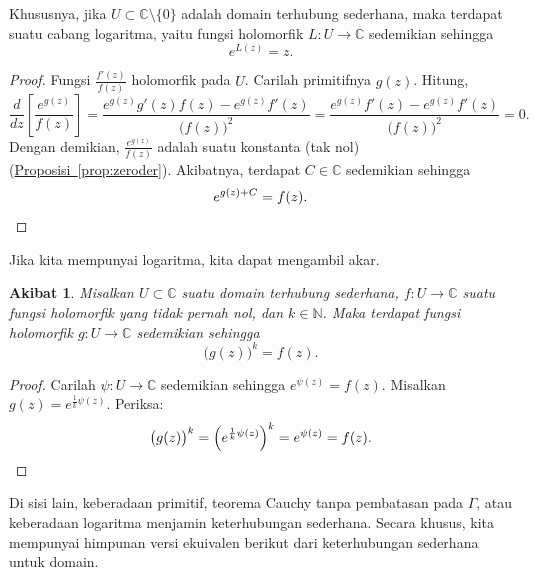 \documentclass[12pt,openany]{book}
\newcommand{\C}{{\mathbb{C}}}
\newcommand{\N}{{\mathbb{N}}}
\theoremstyle{plain}
\newtheorem{cor}[thm]{Akibat}
\theoremstyle{remark}
\theoremstyle{definition}
\theoremstyle{exercise}
\theoremstyle{example}
\newcommand{\propref}[1]{\hyperref[#1]{Proposisi~\ref*{#1}}}
\begin{document}
Khususnya,
jika $U \subset \C \setminus \{ 0 \}$ adalah domain terhubung sederhana, maka
terdapat suatu cabang logaritma, yaitu
fungsi holomorfik $L \colon U \to \C$ sedemikian sehingga
\begin{equation*}
e^{L(z)} = z .
\end{equation*}

\begin{proof}
Fungsi $\frac{f'(z)}{f(z)}$ holomorfik pada $U$.
Carilah primitifnya $g(z)$. Hitung,
\begin{equation*}
\frac{d}{dz} \left[ \frac{e^{g(z)}}{f(z)} \right] =
\frac{ e^{g(z)} g'(z) f(z) - e^{g(z)} f'(z) }{{\bigl(f(z)\bigr)}^2}
=
\frac{ e^{g(z)} f'(z) - e^{g(z)} f'(z) }{{\bigl(f(z)\bigr)}^2}
=
0 .
\end{equation*}
Dengan demikian, $\frac{e^{g(z)}}{f(z)}$ adalah suatu konstanta (tak nol)
(\propref{prop:zeroder}). Akibatnya,
terdapat $C \in \C$ sedemikian sehingga
\begin{equation*}
e^{g(z) + C} = f(z) .
\qedhere
\end{equation*}
\end{proof}

Jika kita mempunyai logaritma, kita dapat mengambil akar.

\begin{cor}
Misalkan $U \subset \C$ suatu domain terhubung sederhana,
$f \colon U \to \C$ suatu fungsi holomorfik yang tidak pernah nol,
dan $k \in \N$.
Maka terdapat fungsi holomorfik $g \colon U \to \C$
sedemikian sehingga
\begin{equation*}
{\bigl(g(z)\bigr)}^k = f(z) .
\end{equation*}
\end{cor}

\begin{proof}
Carilah $\psi \colon U \to \C$ sedemikian sehingga $e^{\psi(z)} = f(z)$. Misalkan
$g(z) = e^{\frac{1}{k} \psi(z)}$. Periksa:
\begin{equation*}
{\bigl(g(z)\bigr)}^k
=
{\left( e^{\frac{1}{k} \psi(z)} \right)}^k
=
e^{\psi(z)} = f(z) . \qedhere
\end{equation*}
\end{proof}

Di sisi lain, keberadaan primitif,
teorema Cauchy tanpa pembatasan pada $\Gamma$, atau keberadaan logaritma menjamin
keterhubungan sederhana. Secara khusus, kita mempunyai himpunan versi ekuivalen
berikut dari keterhubungan sederhana untuk domain.
\end{document}
